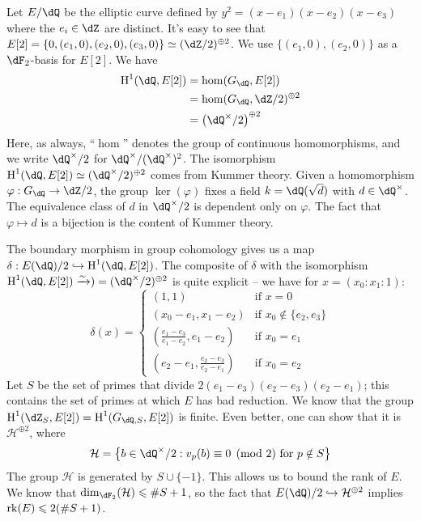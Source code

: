 \begin{example}[descent]
Let $E/\dQ$ be the elliptic curve defined by $y^2=(x-e_1)(x-e_2)(x-e_3)$ where 
the $e_i\in \dZ$ are distinct. It's easy to see that 
$E[2]=\{0,(e_1,0),(e_2,0),(e_3,0)\}\simeq (\dZ/2)^{\oplus 2}$. We use 
$\{(e_1,0),(e_2,0)\}$ as a $\dF_2$-basis for $E[2]$. We have 
\begin{align*}
  \h^1(\dQ,E[2]) &= \hom(G_\dQ,E[2]) \\
    &= \hom(G_\dQ,\dZ/2)^{\oplus 2} \\
    &= \left(\dQ^\times/2\right)^{\oplus 2}
\end{align*}
Here, as always, ``$\hom$'' denotes the group of continuous homomorphisms, and 
we write $\dQ^\times/2$ for $\dQ^\times/(\dQ^\times)^2$. The isomorphism 
$\h^1(\dQ,E[2])\simeq (\dQ^\times/2)^{\oplus 2}$ comes from Kummer theory. 
Given a homomorphism $\varphi:G_\dQ\to \dZ/2$, the group $\ker(\varphi)$ 
fixes a field $k=\dQ(\sqrt d)$ with $d\in \dQ^\times$. The equivalence class of 
$d$ in $\dQ^\times/2$ is dependent only on $\varphi$. The fact that 
$\varphi\mapsto d$ is a bijection is the content of Kummer theory. 

The boundary morphism in group cohomology gives us a map 
$\delta:E(\dQ)/2 \hookrightarrow \h^1(\dQ,E[2])$. The 
composite of $\delta$ with the isomorphism 
$\h^1(\dQ,E[2])\xrightarrow\sim )=(\dQ^\times/2)^{\oplus 2}$ is quite explicit 
-- we have for $x=(x_0:x_1:1)$:
\[
  \delta(x) 
    = \begin{cases}
        (1,1)             & \text{if $x=0$} \\
        (x_0-e_1,x_1-e_2) & \text{if $x_0\notin \{e_2,e_3\}$} \\
        \left(\frac{e_1-e_3}{e_1-e_2},e_1-e_2\right) & \text{if $x_0=e_1$} \\
        \left(e_2-e_1,\frac{e_2-e_3}{e_2-e_1}\right) & \text{if $x_0=e_2$}
      \end{cases}
\]
Let $S$ be the set of primes that divide $2(e_1-e_3)(e_2-e_3)(e_2-e_1)$; this 
contains the set of primes at which $E$ has bad reduction. We know that the 
group $\h^1(\dZ_S,E[2]) = \h^1(G_{\dQ,S},E[2])$ is finite. Even better, one can 
show that it is $\mathcal H^{\oplus 2}$, where 
\[
  \mathcal H = \left\{b\in \dQ^\times/2 : \text{$v_p(b)\equiv 0\pmod 2$ for $p\notin S$}\right\}
\]
The group $\mathcal H$ is generated by $S\cup\{-1\}$. This allows us to bound 
the rank of $E$. We know that $\dim_{\dF_2}(\mathcal H)\leqslant \# S+1$, so 
the fact that $E(\dQ)/2\hookrightarrow \mathcal H^{\oplus 2}$ implies 
$\operatorname{rk}(E) \leqslant 2(\# S+1)$. 


\end{example}
